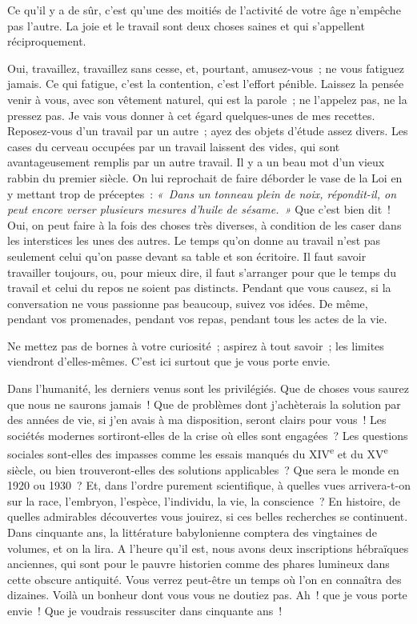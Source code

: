 \documentclass[french,twoside]{book} %
\begin{document}
\noindent Ce qu’il y a de sûr, c’est qu’une des moitiés de l’activité de votre âge n’empêche pas l’autre. La joie et le travail sont deux choses saines et qui s’appellent réciproquement.\par
Oui, travaillez, travaillez sans cesse, et, pourtant, amusez-vous ; ne vous fatiguez jamais. Ce qui fatigue, c’est la contention, c’est l’effort pénible. Laissez la pensée venir à vous, avec son vêtement naturel, qui est la parole ; ne l’appelez pas, ne la pressez pas. Je vais vous donner à cet égard quelques-unes de mes recettes. Reposez-vous d’un travail par un autre ; ayez des objets d’étude assez divers. Les cases du cerveau occupées par un travail laissent des vides, qui sont avantageusement remplis par un autre travail. Il y a un beau mot d’un vieux rabbin du premier siècle. On lui reprochait de faire déborder le vase de la Loi en y mettant trop de préceptes : \emph{« Dans un tonneau plein de noix, répondit-il, on peut encore verser plusieurs mesures d’huile de sésame. »} Que c’est bien dit ! Oui, on peut faire à la fois des choses très diverses, à condition de les caser dans les interstices les unes des autres. Le temps qu’on donne au travail n’est pas seulement celui qu’on passe devant sa table et son écritoire. Il faut savoir travailler toujours, ou, pour mieux dire, il faut s’arranger pour que le temps du travail et celui du repos ne soient pas distincts. Pendant que vous causez, si la conversation ne vous passionne pas beaucoup, suivez vos idées. De même, pendant vos promenades, pendant vos repas, pendant tous les actes de la vie.\par
Ne mettez pas de bornes à votre curiosité ; aspirez à tout savoir ; les limites viendront d’elles-mêmes. C’est ici surtout que je vous porte envie.\par
Dans l’humanité, les derniers venus sont les privilégiés. Que de choses vous saurez que nous ne saurons jamais ! Que de problèmes dont j’achèterais la solution par des années de vie, si j’en avais à ma disposition, seront clairs pour vous ! Les sociétés modernes sortiront-elles de la crise où elles sont engagées ? Les questions sociales sont-elles des impasses comme les essais manqués du XIV\textsuperscript{e} et du XV\textsuperscript{e} siècle, ou bien trouveront-elles des solutions applicables ? Que sera le monde en 1920 ou 1930 ? Et, dans l’ordre purement scientifique, à quelles vues arrivera-t-on sur la race, l’embryon, l’espèce, l’individu, la vie, la conscience ? En histoire, de quelles admirables découvertes vous jouirez, si ces belles recherches se continuent. Dans cinquante ans, la littérature babylonienne comptera des vingtaines de volumes, et on la lira. A l’heure qu’il est, nous avons deux inscriptions hébraïques anciennes, qui sont pour le pauvre historien comme des phares lumineux dans cette obscure antiquité. Vous verrez peut-être un temps où l’on en connaîtra des dizaines. Voilà un bonheur dont vous vous ne doutiez pas. Ah ! que je vous porte envie ! Que je voudrais ressusciter dans cinquante ans !\par
\end{document}

